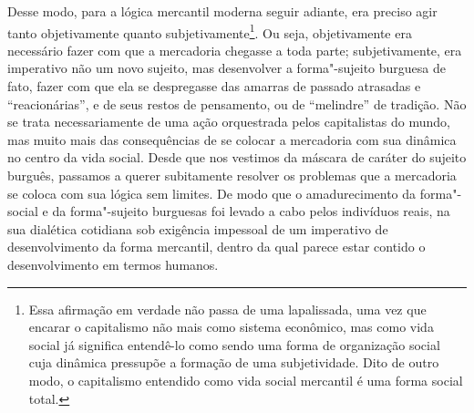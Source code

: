 {Desse modo, para a lógica mercantil moderna seguir adiante, era preciso
agir tanto objetivamente quanto subjetivamente\footnote{Essa afirmação
  em verdade não passa de uma lapalissada, uma vez que encarar o
  capitalismo não mais como sistema econômico, mas como vida social já significa
  entendê-lo como sendo uma forma de organização social cuja dinâmica
  pressupõe a formação de uma subjetividade. Dito de outro modo, o
  capitalismo entendido como vida social mercantil é uma forma social
  total.}. Ou seja, objetivamente era necessário fazer com que a
mercadoria chegasse a toda parte; subjetivamente, era imperativo não um
novo sujeito, mas desenvolver a forma"-sujeito burguesa de fato, fazer
com que ela se despregasse das amarras de passado atrasadas e
``reacionárias'', e de seus restos de pensamento, ou de ``melindre'' de
tradição. Não se trata necessariamente de uma ação orquestrada pelos
capitalistas do mundo, mas muito mais das consequências de se colocar a
mercadoria com sua dinâmica no centro da vida social. Desde que nos
vestimos da máscara de caráter do sujeito burguês, passamos a querer
subitamente resolver os problemas que a mercadoria se coloca com sua
lógica sem limites. De modo que o amadurecimento da forma"-social e da
forma"-sujeito burguesas foi levado a cabo pelos indivíduos reais, na sua
dialética cotidiana sob exigência impessoal de um imperativo de
desenvolvimento da forma mercantil, dentro da qual parece estar contido
o desenvolvimento em termos humanos.

}

